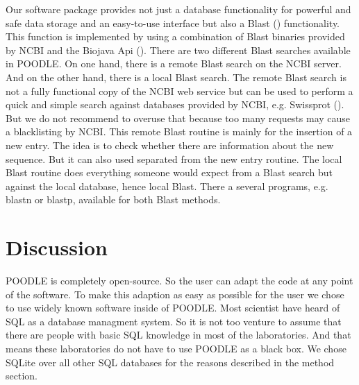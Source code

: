 \documentclass{bioinfo}
\begin{document}
\begin{methods}
Our software package provides not just a database functionality for powerful and safe data storage 
and an easy-to-use interface but also a Blast (\citealp{Altschul01}) functionality. This function 
is implemented by using a combination of Blast binaries provided by NCBI and the Biojava Api 
(\citealp{Prlic01}). There are two different Blast searches available in POODLE. On one hand, there 
is a remote Blast search on the NCBI server. And on the other hand, there is a local Blast search. 
The remote Blast search is not a fully functional copy of the NCBI web service but can be used to 
perform a quick and simple search against databases provided by NCBI, e.g. Swissprot (\citealp{Donavan01}). But we 
do not recommend to overuse that because too many requests may cause a blacklisting by NCBI. This 
remote Blast routine is mainly for the insertion of a new entry. The idea is to check whether there 
are information about the new sequence. But it can also used separated from the new entry routine. 
The local Blast routine does everything someone would 
expect from a Blast search but against the local database, hence local Blast. There a several programs, 
e.g. blastn or blastp, available for both Blast methods. 

\end{methods}




\section{Discussion}

POODLE is completely open-source. So the user can adapt the code at any point of the software. To make 
this adaption as easy as possible for the user we chose to use widely known software inside of POODLE. 
Most scientist have heard of SQL as a database managment system. So it is not too venture to assume 
that there are people with basic SQL knowledge in most of the laboratories. And that means these 
laboratories do not have to use POODLE as a black box. We chose SQLite over all other SQL databases 
for the reasons described in the method section. 
\end{document}
